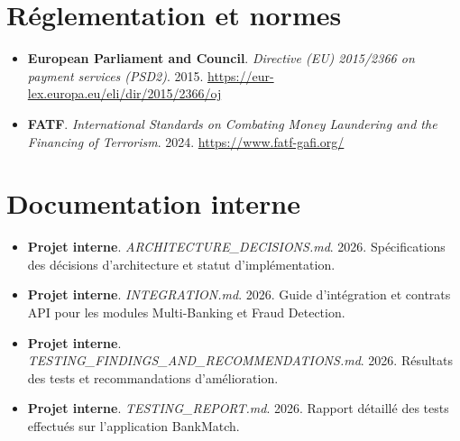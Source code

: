 \documentclass[12pt,a4paper]{extreport}
\begin{document}
\section*{Réglementation et normes}

\begin{itemize}
    \item[20] \textbf{European Parliament and Council}. \emph{Directive (EU) 2015/2366 on payment services (PSD2)}. 2015. \url{https://eur-lex.europa.eu/eli/dir/2015/2366/oj}
    \item[21] \textbf{FATF}. \emph{International Standards on Combating Money Laundering and the Financing of Terrorism}. 2024. \url{https://www.fatf-gafi.org/}
\end{itemize}

\section*{Documentation interne}

\begin{itemize}
    \item[22] \textbf{Projet interne}. \emph{ARCHITECTURE\_DECISIONS.md}. 2026. Spécifications des décisions d'architecture et statut d'implémentation.
    \item[23] \textbf{Projet interne}. \emph{INTEGRATION.md}. 2026. Guide d'intégration et contrats API pour les modules Multi-Banking et Fraud Detection.
    \item[24] \textbf{Projet interne}. \emph{TESTING\_FINDINGS\_AND\_RECOMMENDATIONS.md}. 2026. Résultats des tests et recommandations d'amélioration.
    \item[25] \textbf{Projet interne}. \emph{TESTING\_REPORT.md}. 2026. Rapport détaillé des tests effectués sur l'application BankMatch.
\end{itemize}
\end{document}
